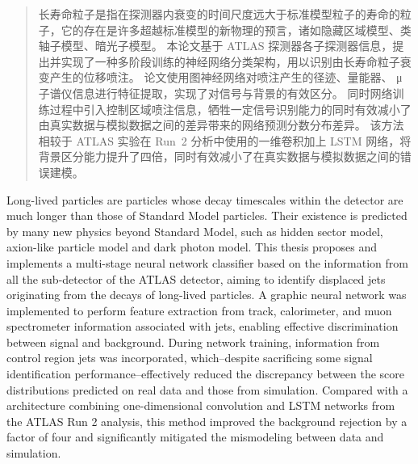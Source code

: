 

\begin{abstract}
  长寿命粒子是指在探测器内衰变的时间尺度远大于标准模型粒子的寿命的粒子，它的存在是许多超越标准模型的新物理的预言，诸如隐藏区域模型、类轴子模型、暗光子模型。
  本论文基于 ATLAS 探测器各子探测器信息，提出并实现了一种多阶段训练的神经网络分类架构，用以识别由长寿命粒子衰变产生的位移喷注。
  论文使用图神经网络对喷注产生的径迹、量能器、 μ 子谱仪信息进行特征提取，实现了对信号与背景的有效区分。
  同时网络训练过程中引入控制区域喷注信息，牺牲一定信号识别能力的同时有效减小了由真实数据与模拟数据之间的差异带来的网络预测分数分布差异。
  该方法相较于 ATLAS 实验在 Run~2 分析中使用的一维卷积加上 LSTM 网络，将背景区分能力提升了四倍，同时有效减小了在真实数据与模拟数据之间的错误建模。
\end{abstract}

\begin{abstract*}
  Long-lived particles are particles whose decay timescales within the detector are much longer than those of Standard Model particles. Their existence is predicted by many new physics beyond Standard Model, such as hidden sector model, axion-like particle model and dark photon model.
  This thesis proposes and implements a multi-stage neural network classifier based on the information from all the sub-detector of the ATLAS detector, aiming to identify displaced jets originating from the decays of long-lived particles.
  A graphic neural network was implemented to perform feature extraction from track, calorimeter, and muon spectrometer information associated with jets, enabling effective discrimination between signal and background.
  During network training, information from control region jets was incorporated, which--despite sacrificing some signal identification performance--effectively reduced the discrepancy between the score distributions predicted on real data and those from simulation.
  Compared with a architecture combining one-dimensional convolution and LSTM networks from the ATLAS Run 2 analysis, this method improved the background rejection by a factor of four and significantly mitigated the mismodeling between data and simulation.
\end{abstract*}
